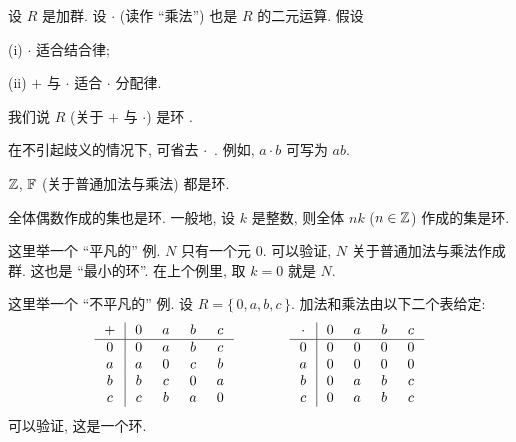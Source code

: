 \begin{definition}
    设 $R$ 是加群. 设 $\cdot$ (读作 ``乘法'') 也是 $R$ 的二元运算. 假设

    (i) $\cdot$ 适合结合律;

    (ii) $+$ 与 $\cdot$ 适合 $\cdot$ 分配律.

    我们说 $R$ (关于 $+$ 与 $\cdot$) 是环 .
\end{definition}

\begin{remark}
    在不引起歧义的情况下, 可省去 $\cdot$ \,. 例如, $a \cdot b$ 可写为 $ab$.
\end{remark}

\begin{example}
    $\mathbb{Z}$, $\mathbb{F}$ (关于普通加法与乘法) 都是环.
\end{example}

\begin{example}
    全体偶数作成的集也是环. 一般地, 设 $k$ 是整数, 则全体 $nk$ ($n \in \mathbb{Z}$) 作成的集是环.
\end{example}

\begin{example}
    这里举一个 ``平凡的''  例. $N$ 只有一个元 $0$. 可以验证, $N$ 关于普通加法与乘法作成群. 这也是 ``最小的环''. 在上个例里, 取 $k=0$ 就是 $N$.
\end{example}

\begin{example}
    这里举一个 ``不平凡的''  例. 设 $R = \{\, 0,a,b,c \,\}$. 加法和乘法由以下二个表给定:
    \begin{align*}
        \arraycolsep=0.25cm
        \begin{array}{c|cccc}
            + & 0 & a & b & c \\ \hline
            0 & 0 & a & b & c \\
            a & a & 0 & c & b \\
            b & b & c & 0 & a \\
            c & c & b & a & 0 \\
        \end{array}
        \qquad \qquad
        \begin{array}{c|cccc}
            \cdot & 0 & a & b & c \\ \hline
            0     & 0 & 0 & 0 & 0 \\
            a     & 0 & 0 & 0 & 0 \\
            b     & 0 & a & b & c \\
            c     & 0 & a & b & c \\
        \end{array}
    \end{align*}
    可以验证, 这是一个环.
\end{example}

